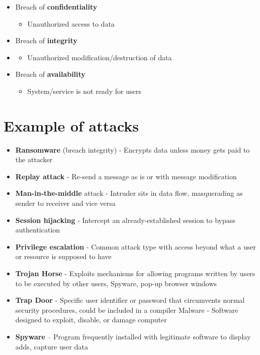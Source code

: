 \begin{itemize}
    \item Breach of \textbf{confidentiality}
    \begin{itemize}
        \item[] Unauthorized access to data
    \end{itemize}
    \item Breach of \textbf{integrity}
        \item[] \begin{itemize}
    \item Unauthorized modification/destruction of data
    \end{itemize}
    \item Breach of \textbf{availability}
    \begin{itemize}
        \item[] System/service is not ready for users
    \end{itemize}
\end{itemize}

\section{Example of attacks}

\begin{itemize}
    \item \textbf{Ransomware} (breach integrity) - Encrypts data unless money gets paid to the attacker
    \item \textbf{Replay attack} - Re-send a message as is or with message modification
    \item \textbf{Man-in-the-middle} attack - Intruder sits in data flow, masquerading as sender to receiver and vice versa
    \item \textbf{Session hijacking} - Intercept an already-established session to bypass authentication
    \item \textbf{Privilege escalation} - Common attack type with access beyond what a user or resource is supposed to have
    \item \textbf{Trojan Horse} - Exploits mechanisms for allowing programs written by users to be executed by other users, Spyware, pop-up browser windows
    \item \textbf{Trap Door} - Specific user identifier or password that circumvents normal security procedures, could be included in a compiler Malware - Software designed to exploit, disable, or damage computer
    \item \textbf{Spyware} – Program frequently installed with legitimate software to display adds, capture user data
\end{itemize}

